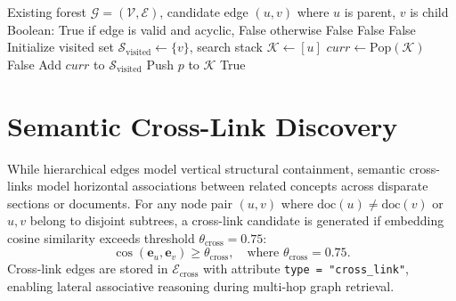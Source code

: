 \documentclass[12pt,a4paper]{report}
\begin{document}
\begin{algorithm}[h!]
\caption{Cycle-Proof Upward DFS Edge Validation}
\label{alg:upward_dfs}
\begin{algorithmic}[1]
\REQUIRE Existing forest $\mathcal{G} = (\mathcal{V}, \mathcal{E})$, candidate edge $(u, v)$ where $u$ is parent, $v$ is child
\ENSURE Boolean: True if edge is valid and acyclic, False otherwise
    \RETURN False 
\ENDIF
{}
    \RETURN False 
\ENDIF
{}
    \RETURN False 
\ENDIF
\STATE Initialize visited set $\mathcal{S}_{\text{visited}} \leftarrow \{v\}$, search stack $\mathcal{K} \leftarrow [u]$
    \STATE $curr \leftarrow \text{Pop}(\mathcal{K})$
        \RETURN False 
    \ENDIF
        \STATE Add $curr$ to $\mathcal{S}_{\text{visited}}$
            \STATE Push $p$ to $\mathcal{K}$
        \ENDFOR
    \ENDIF
\ENDWHILE
\RETURN True 
\end{algorithmic}
\end{algorithm}

\clearpage
\section{Semantic Cross-Link Discovery}
While hierarchical edges model vertical structural containment, semantic cross-links model horizontal associations between related concepts across disparate sections or documents. For any node pair $(u, v)$ where $\text{doc}(u) \ne \text{doc}(v)$ or $u, v$ belong to disjoint subtrees, a cross-link candidate is generated if embedding cosine similarity exceeds threshold $\theta_{\text{cross}} = 0.75$:
\begin{equation}
\cos(\mathbf{e}_u, \mathbf{e}_v) \ge \theta_{\text{cross}}, \quad \text{where } \theta_{\text{cross}} = 0.75.
\end{equation}
Cross-link edges are stored in $\mathcal{E}_{\text{cross}}$ with attribute \texttt{type = "cross\_link"}, enabling lateral associative reasoning during multi-hop graph retrieval.
\end{document}
